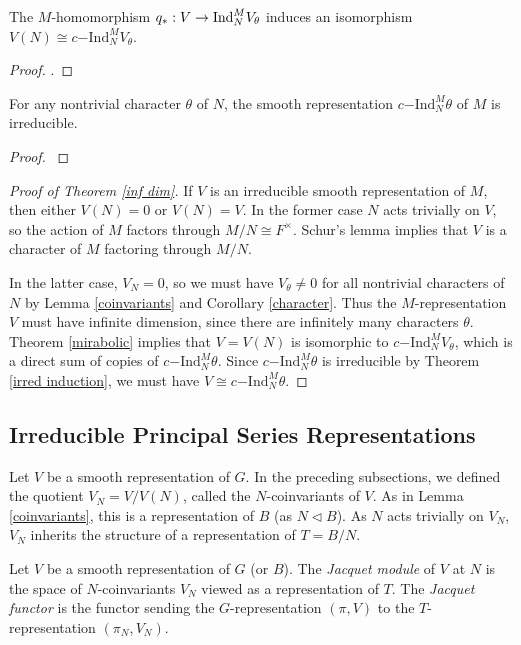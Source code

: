 \begin{thm}\label{mirabolic}
    The $M$-homomorphism $q_*: V \to \mathrm{Ind}_N^M V_\theta$ induces an isomorphism $V(N) \cong c\mathrm{-Ind}_N^M V_\theta$. 
\end{thm}
\begin{proof}
    \cite[Theorem 8.3]{BH1}.
\end{proof}

\begin{thm}\label{irred induction}
    For any nontrivial character $\theta$ of $N$, the smooth representation $c\mathrm{-Ind}_N^M \theta$ of $M$ is irreducible. 
\end{thm}
\begin{proof}
    \cite[Corollary 8.2]{BH1}
\end{proof}

\begin{proof}[Proof of Theorem \ref{inf dim}]
    If $V$ is an irreducible smooth representation of $M$, then either $V(N)=0$ or $V(N)=V$. In the former case $N$ acts trivially on $V$, so the action of $M$ factors through $M/N \cong F^\times$. Schur's lemma implies that $V$ is a character of $M$ factoring through $M/N$. 
    
    In the latter case, $V_N=0$, so we must have $V_\theta \neq 0$ for all nontrivial characters of $N$ by Lemma \ref{coinvariants} and Corollary \ref{character}. Thus the $M$-representation $V$ must have infinite dimension, since there are infinitely many characters $\theta$. Theorem \ref{mirabolic} implies that $V = V(N)$ is isomorphic to $c\mathrm{-Ind}_N^M V_\theta$, which is a direct sum of copies of $c\mathrm{-Ind}_N^M \theta$. Since $c\mathrm{-Ind}_N^M \theta$ is irreducible by Theorem \ref{irred induction}, we must have $V\cong c\mathrm{-Ind}_N^M \theta$. 
\end{proof}




\subsection{Irreducible Principal Series Representations}

Let $V$ be a smooth representation of $G$. In the preceding subsections, we defined the quotient $V_N =V/V(N)$, called the $N$-coinvariants of $V$. As in Lemma \ref{coinvariants}, this is a representation of $B$ (as $N \lhd B$). As $N$ acts trivially on $V_N$, $V_N$ inherits the structure of a representation of $T=B/N$.

\begin{defn}
    Let $V$ be a smooth representation of $G$ (or $B$). The \textit{Jacquet module} of $V$ at $N$ is the space of $N$-coinvariants $V_N$ viewed as a representation of $T$. The \textit{Jacquet functor} is the functor sending the $G$-representation $(\pi,V)$ to the $T$-representation $(\pi_N,V_N)$. 
\end{defn}

